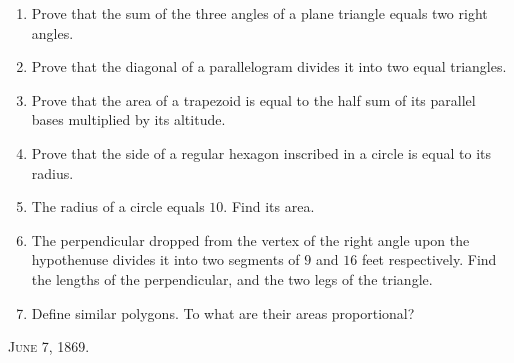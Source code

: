 \documentclass[12pt]{article}
\begin{document}
\begin{enumerate}[itemsep=18pt] %
    \item Prove that the sum of the three angles of a plane triangle equals two right angles.
    
    \item Prove that the diagonal of a parallelogram divides it into two equal triangles.
    
    \item Prove that the area of a trapezoid is equal to the half sum of its parallel bases multiplied by its altitude.
    
    \item Prove that the side of a regular hexagon inscribed in a circle is equal to its radius.
    
    \item The radius of a circle equals $10$. Find its area.
    
    \item The perpendicular dropped from the vertex of the right angle upon the hypothenuse divides it into two segments of $9$ and $16$ feet respectively. Find the lengths of the perpendicular, and the two legs of the triangle.
    
    \item Define similar polygons. To what are their areas proportional?
\end{enumerate}

\hspace{0.5cm}\textsc{\small{June 7, 1869}}.
\end{document}
